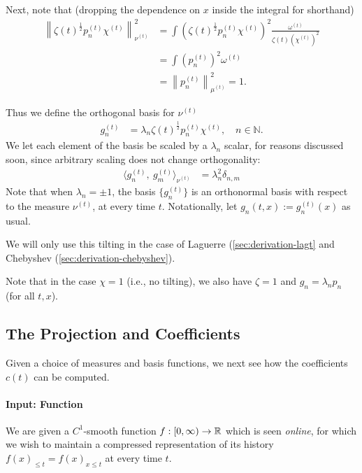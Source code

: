 \documentclass[../hippo.tex]{subfiles}
\begin{document}
Next, note that (dropping the dependence on $x$ inside the integral for shorthand)
\begin{align*}
  \left\| \zeta(t)^{\frac{1}{2}} p_n^{(t)} \chi^{(t)} \right\|^2_{\nu^{(t)}}
  &= \int \left( \zeta(t)^{\frac{1}{2}} p_n^{(t)} \chi^{(t)} \right)^2 \frac{\omega^{(t)}}{\zeta(t) (\chi^{(t)})^2}
  \\
  &= \int (p_n^{(t)})^2 \omega^{(t)}
  \\
  &= \left\| p_n^{(t)} \right\|^2_{\mu^{(t)}} = 1.
\end{align*}

Thus we define the orthogonal basis for $\nu^{(t)}$
\begin{align}
  \label{eq:framework-g}
  g_n^{(t)} &= \lambda_n \zeta(t)^{\frac{1}{2}} p_n^{(t)} \chi^{(t)}, \quad n \in \mathbb{N}
  .
\end{align}
We let each element of the basis be scaled by a $\lambda_n$ scalar, for reasons discussed soon,
since arbitrary scaling does not change orthogonality:
\begin{align*}
  \langle g_n^{(t)},\ g_m^{(t)} \rangle_{\nu^{(t)}} &= \lambda_n^2 \delta_{n, m}
\end{align*}
Note that when $\lambda_n = \pm 1$, the basis $\{g_n^{(t)}\}$ is an orthonormal basis with respect to the measure $\nu^{(t)}$,
at every time $t$.
Notationally, let $g_n(t, x) := g_n^{(t)}(x)$ as usual.



We will only use this tilting in the case of Laguerre (\cref{sec:derivation-lagt} and Chebyshev (\cref{sec:derivation-chebyshev}).

Note that in the case $\chi = 1$ (i.e., no tilting),
we also have $\zeta = 1$ and $g_n = \lambda_n p_n$ (for all $t, x$).


\subsection{The Projection and Coefficients}
\label{sec:hippo-calculation}


Given a choice of measures and basis functions, we next see how the coefficients
$c(t)$ can be computed.

\paragraph{Input: Function}
We are given a $C^1$-smooth function $f: [0, \infty) \to \mathbb{R}$ which is seen \emph{online}, for which we wish to maintain a compressed representation of its history $f(x)_{\le t} = f(x)_{x \le t}$ at every time $t$.
\end{document}
